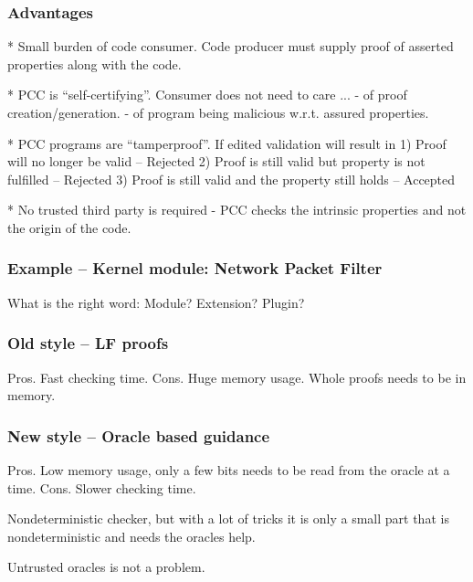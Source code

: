 \documentclass[slidestop,compress,mathserif]{beamer}
\begin{document}
\begin{frame}
  \frametitle{Advantages}

   * Small burden of code consumer. Code producer must supply proof of asserted
     properties along with the code.

   * PCC is ``self-certifying''. Consumer does not need to care ...
     - of proof creation/generation.
     - of program being malicious w.r.t. assured properties.

   * PCC programs are ``tamperproof''. If edited validation will result in
     1) Proof will no longer be valid -- Rejected
     2) Proof is still valid but property is not fulfilled -- Rejected
     3) Proof is still valid and the property still holds -- Accepted

   * No trusted third party is required
     -  PCC checks the intrinsic properties and not the origin of the code.
\end{frame}

\begin{frame}
  \frametitle{Example -- Kernel module: Network Packet Filter}
  What is the right word: Module? Extension? Plugin?
\end{frame}

\begin{frame}
  \frametitle{Old style -- LF proofs}

  Pros. 
    Fast checking time.
  Cons.
    Huge memory usage. Whole proofs needs to be in memory.
  
\end{frame}

\begin{frame} 
  \frametitle{New style -- Oracle based guidance}

  Pros.
     Low memory usage, only a few bits needs to be read from the oracle at a time.
  Cons.
     Slower checking time.
     

  Nondeterministic checker, but with a lot of tricks it is only a small part
  that is nondeterministic and needs the oracles help.

  Untrusted oracles is not a problem.

  
  
\end{frame}
\end{document}
